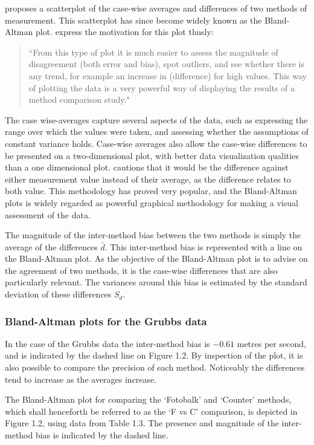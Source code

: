 \documentclass[Chap2main.tex]{subfiles}
\begin{document}
\citet{BA83} proposes a scatterplot of the case-wise averages and differences of two methods of measurement. This scatterplot has since become widely known as the Bland-Altman plot. \citet*{BA83} express the
motivation for this plot thusly:
\begin{quote}
	``From this type of plot it is much easier to assess the magnitude
	of disagreement (both error and bias), spot outliers, and see
	whether there is any trend, for example an increase in (difference) for high values. This way of plotting the data is a very powerful way of displaying the results of a method comparison study."
\end{quote}

The case wise-averages capture several aspects of the data, such as expressing the range over which the values were taken, and assessing whether the assumptions of constant variance holds.
Case-wise averages also allow the case-wise differences to be presented on a two-dimensional plot, with better data visualization qualities than a one dimensional plot. \citet{BA86}
cautions that it would be the difference against either measurement value instead of their average, as the difference relates to both value. This methodology has proved very popular, and the Bland-Altman plots is widely regarded as powerful graphical methodology for making a visual assessment of the data.

The magnitude of the inter-method bias between the two methods is simply the average of the differences $\bar{d}$. This inter-method bias is represented with a line on the Bland-Altman plot. As the objective of the Bland-Altman plot is to advise on the agreement of two methods, it is the case-wise differences that are also particularly relevant. The variances around this bias is estimated by the standard deviation of these differences $S_{d}$.

\subsubsection{Bland-Altman plots for the Grubbs data}

In the case of the Grubbs data the inter-method bias is $-0.61$ metres per second, and is indicated by the dashed line on Figure 1.2. By inspection of the plot, it is also possible to compare the precision of each method. Noticeably the differences tend to increase as the averages increase.


The Bland-Altman plot for comparing the `Fotobalk' and `Counter'
methods, which shall henceforth be referred to as the `F vs C'
comparison,  is depicted in Figure 1.2, using data from Table 1.3.
The presence and magnitude of the inter-method bias is indicated
by the dashed line.
\newpage
\end{document}
